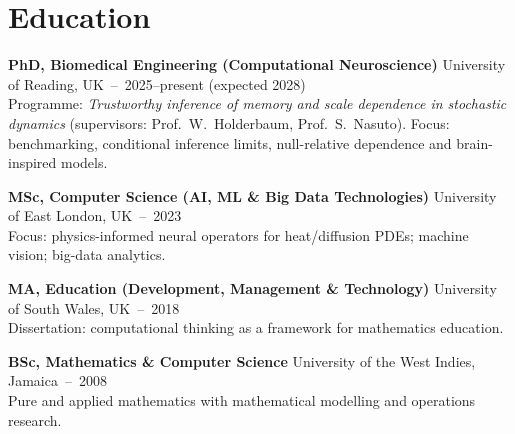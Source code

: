 \documentclass[10pt,a4paper]{article}
\newcommand{\entry}[2]{{\textbf{#1}} \hfill {\small\color{muted}#2}\\[1pt]}
\begin{document}
\section{Education}
\entry{PhD, Biomedical Engineering (Computational Neuroscience)}{University of Reading, UK \,--\, 2025--present (expected 2028)}
Programme: \emph{Trustworthy inference of memory and scale dependence in stochastic dynamics} (supervisors: Prof.\ W.~Holderbaum, Prof.\ S.~Nasuto). Focus: benchmarking, conditional inference limits, null-relative dependence and brain-inspired models.

\entry{MSc, Computer Science (AI, ML \& Big Data Technologies)}{University of East London, UK \,--\, 2023}
Focus: physics-informed neural operators for heat/diffusion PDEs; machine vision; big-data analytics.

\entry{MA, Education (Development, Management \& Technology)}{University of South Wales, UK \,--\, 2018}
Dissertation: computational thinking as a framework for mathematics education.

\entry{BSc, Mathematics \& Computer Science}{University of the West Indies, Jamaica \,--\, 2008}
Pure and applied mathematics with mathematical modelling and operations research.

\end{document}
